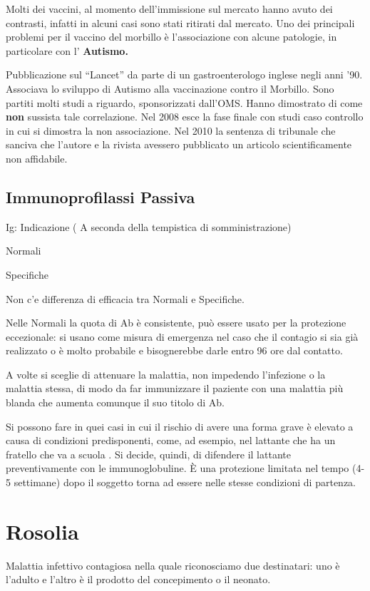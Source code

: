 Molti dei vaccini, al momento dell'immissione sul mercato hanno avuto
dei contrasti, infatti in alcuni casi sono stati ritirati dal mercato.
Uno dei principali problemi per il vaccino del morbillo è l'associazione
con alcune patologie, in particolare con l' \textbf{Autismo.}

Pubblicazione sul ``Lancet'' da parte di un gastroenterologo inglese
negli anni '90. Associava lo sviluppo di Autismo alla vaccinazione
contro il Morbillo. Sono partiti molti studi a riguardo, sponsorizzati
dall'OMS. Hanno dimostrato di come \textbf{non} sussista tale
correlazione. Nel 2008 esce la fase finale con studi caso controllo in
cui si dimostra la non associazione. Nel 2010 la sentenza di tribunale
che sanciva che l'autore e la rivista avessero pubblicato un articolo
scientificamente non affidabile.

\subsection{Immunoprofilassi Passiva}

Ig: Indicazione ( A seconda della tempistica di somministrazione)

Normali

Specifiche

Non c'e differenza di efficacia tra Normali e Specifiche.

Nelle Normali la quota di Ab è
consistente, può essere usato per la protezione eccezionale: si usano
come misura di emergenza nel caso che il contagio si sia già realizzato
o è molto probabile e bisognerebbe darle entro 96 ore dal contatto.

A volte si sceglie di attenuare la malattia, non impedendo l'infezione o
la malattia stessa, di modo da far immunizzare il paziente con una
malattia più blanda che aumenta comunque il suo titolo di Ab.

Si possono fare in quei casi in cui il rischio di avere una forma grave
è elevato a causa di condizioni predisponenti, come, ad esempio, nel
lattante che ha un fratello che va a scuola . Si decide, quindi, di
difendere il lattante preventivamente con le immunoglobuline. È una
protezione limitata nel tempo (4-5 settimane) dopo il soggetto torna ad
essere nelle stesse condizioni di partenza.


\section{Rosolia}
Malattia infettivo contagiosa nella quale riconosciamo due destinatari:
uno è l'adulto e l'altro è il prodotto del concepimento o il neonato.

